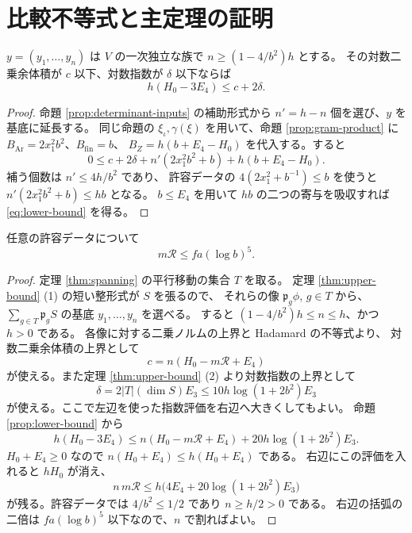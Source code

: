 \section{比較不等式と主定理の証明}\label{sec:conclusion}

\begin{proposition}[対数二乗余体積と指数の下界]\label{prop:lower-bound}
\(y=(y_1,\ldots,y_n)\) は \(V\) の一次独立な族で
\(n\ge(1-4/b^2)h\) とする。
その対数二乗余体積が \(c\) 以下、対数指数が \(\delta\) 以下ならば
\begin{equation}\label{eq:lower-bound}
  h(H_0-3E_4)\le c+2\delta .
\end{equation}
\end{proposition}

\begin{proof}
命題 \ref{prop:determinant-inputs} の補助形式から
\(n'=h-n\) 個を選び、\(y\) を基底に延長する。
同じ命題の \(\xi_\iota,\gamma(\xi)\) を用いて、命題 \ref{prop:gram-product}
に \(B_{\mathrm{Ar}}=2x_1^2b^2\)、\(B_{\mathrm{fin}}=b\)、
\(B_Z=h(b+E_4-H_0)\) を代入する。すると
\[
 0\le c+2\delta+n'(2x_1^2b^2+b)+h(b+E_4-H_0).
\]
補う個数は \(n'\le4h/b^2\) であり、
許容データの \(4(2x_1^2+b^{-1})\le b\) を使うと
\(n'(2x_1^2b^2+b)\le hb\) となる。
\(b\le E_4\) を用いて \(hb\) の二つの寄与を吸収すれば
\eqref{eq:lower-bound} を得る。
\end{proof}

\begin{theorem}[比較不等式]\label{thm:main-inequality}
任意の許容データについて
\begin{equation}\label{eq:main-ineq}
 m\mathcal R\le fa(\log b)^5 .
\end{equation}
\end{theorem}

\begin{proof}
定理 \ref{thm:spanning} の平行移動の集合 \(T\) を取る。
定理 \ref{thm:upper-bound} (1) の短い整形式が \(S\) を張るので、
それらの像 \(\mathfrak p_g\phi\), \(g\in T\) から、
\(\sum_{g\in T}\mathfrak p_g S\) の基底 \(y_1,\ldots,y_n\) を選べる。
すると \((1-4/b^2)h\le n\le h\)、かつ \(h>0\) である。
各像に対する二乗ノルムの上界と Hadamard の不等式より、
対数二乗余体積の上界として
\[
   c=n(H_0-m\mathcal R+E_4)
\]
が使える。また定理 \ref{thm:upper-bound} (2) より対数指数の上界として
\[
  \delta=2|T|(\dim S)E_3\le 10h\log(1+2b^2)E_3
\]
が使える。ここで左辺を使った指数評価を右辺へ大きくしてもよい。
命題 \ref{prop:lower-bound} から
\[
 h(H_0-3E_4)
  \le n(H_0-m\mathcal R+E_4)+20h\log(1+2b^2)E_3.
\]
\(H_0+E_4\ge0\) なので \(n(H_0+E_4)\le h(H_0+E_4)\) である。
右辺にこの評価を入れると \(hH_0\) が消え、
\[
 n\,m\mathcal R
   \le h\bigl(4E_4+20\log(1+2b^2)E_3\bigr)
\]
が残る。許容データでは \(4/b^2\le1/2\) であり \(n\ge h/2>0\) である。
右辺の括弧の二倍は \(fa(\log b)^5\) 以下なので、\(n\) で割ればよい。
\end{proof}

